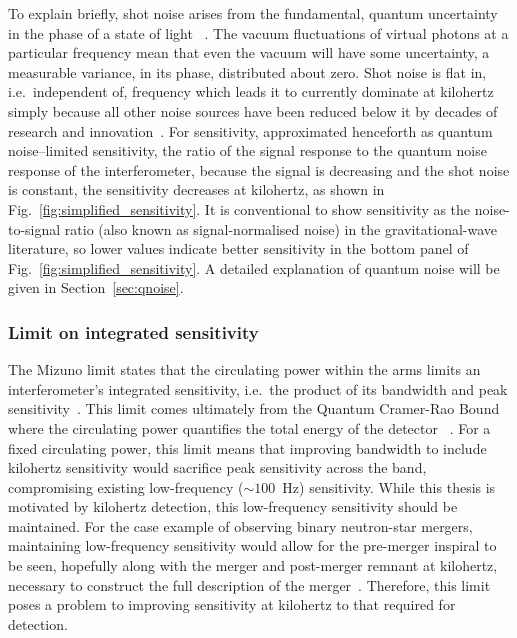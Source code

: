 To explain briefly, shot noise arises from the fundamental, quantum uncertainty in the phase of a state of light~\cite{} . The vacuum fluctuations of virtual photons at a particular frequency mean that even the vacuum will have some uncertainty, a measurable variance, in its phase, distributed about zero. %
Shot noise is flat in, i.e.\ independent of, frequency which leads it to currently dominate at kilohertz simply because all other noise sources have been reduced below it by decades of research and innovation~\cite{}. For sensitivity, approximated henceforth as quantum noise--limited sensitivity, the ratio of the signal response to the quantum noise response of the interferometer, because the signal is decreasing and the shot noise is constant, the sensitivity decreases at kilohertz, as shown in Fig.~\ref{fig:simplified_sensitivity}. It is conventional to show sensitivity as the noise-to-signal ratio (also known as signal-normalised noise) in the gravitational-wave literature, so lower values indicate better sensitivity in the bottom panel of Fig.~\ref{fig:simplified_sensitivity}.
A detailed explanation of quantum noise will be given in Section~\ref{sec:qnoise}.


\subsubsection{Limit on integrated sensitivity}

The Mizuno limit states that the circulating power within the arms limits an interferometer's integrated sensitivity, i.e.\ the product of its bandwidth and peak sensitivity~\cite{miaoFundamentalQuantumLimit2017}.
This limit comes ultimately from the Quantum Cramer-Rao Bound where the circulating power quantifies the total energy of the detector~\cite{} .
For a fixed circulating power, this limit means that improving bandwidth to include kilohertz sensitivity would sacrifice peak sensitivity across the band, compromising existing low-frequency ($\sim100$~Hz) sensitivity. %
While this thesis is motivated by kilohertz detection, this low-frequency sensitivity should be maintained. For the case example of observing binary neutron-star mergers, maintaining low-frequency sensitivity would allow for the pre-merger inspiral to be seen, hopefully along with the merger and post-merger remnant at kilohertz, necessary to construct the full description of the merger~\cite{}.
Therefore, this limit poses a problem to improving sensitivity at kilohertz to that required for detection.


